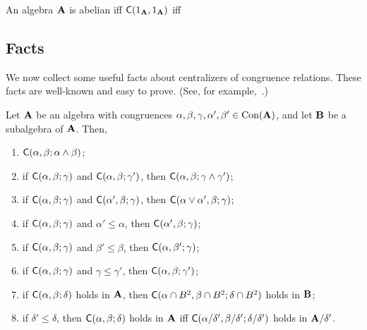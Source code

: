 \begin{remark}
An algebra $\mathbf{A}$ is abelian iff $\mathsf{C}(1_{\mathbf{A}}, 1_{\mathbf{A}})$ iff
\end{remark}

\subsection{Facts}
We now collect some useful facts about centralizers of congruence relations.
These facts are well-known and easy to prove. (See, for example,~\cite{MR3076179}.)
\begin{lemma}
\label{lem:centralizers}
Let $\mathbf{A}$ be an algebra with congruences 
$\alpha, \beta, \gamma, \alpha', \beta' \in \operatorname{Con}(\mathbf{A})$, and let 
$\mathbf{B}$ be a subalgebra of $\mathbf{A}$. Then,
\begin{enumerate}
\item \label{fact:centralizing_over_meet}
  $\mathsf{C}(\alpha, \beta; \alpha \wedge \beta)$;
\item \label{fact:centralizing_over_meet2}
  if $\mathsf{C}(\alpha, \beta; \gamma)$ and $\mathsf{C}(\alpha, \beta; \gamma')$, then
  $\mathsf{C}(\alpha, \beta; \gamma \wedge \gamma')$;
\item \label{fact:centralizing_over_join1}
  if $\mathsf{C}(\alpha, \beta; \gamma)$ and $\mathsf{C}(\alpha', \beta; \gamma)$, then
  $\mathsf{C}(\alpha \vee \alpha', \beta; \gamma)$;
\item \label{fact:monotone_centralizers1}
  if $\mathsf{C}(\alpha, \beta; \gamma)$ and $\alpha' \leq \alpha$, then 
  $\mathsf{C}(\alpha', \beta; \gamma)$;
\item \label{fact:monotone_centralizers2}
  if $\mathsf{C}(\alpha, \beta; \gamma)$ and $\beta' \leq \beta$, then
  $\mathsf{C}(\alpha, \beta'; \gamma)$;
\item \label{fact:dual_monotone_centralizers}
  if $\mathsf{C}(\alpha, \beta; \gamma)$ and $\gamma \leq \gamma'$, then
  $\mathsf{C}(\alpha, \beta; \gamma')$;
\item \label{item:subalg}
  if $\mathsf{C}(\alpha, \beta; \delta)$ holds in $\mathbf{A}$, 
  then $\mathsf{C}(\alpha\cap B^2, \beta\cap B^2;\delta\cap B^2)$ holds in $\mathbf{B}$;
\item \label{item:factors}
  if $\delta' \leq \delta$, then $\mathsf{C}(\alpha, \beta; \delta)$ holds 
  in $\mathbf{A}$ iff $\mathsf{C}(\alpha/\delta', \beta/\delta'; \delta/\delta')$
  holds in $\mathbf{A}/\delta'$.
\end{enumerate}
\end{lemma}
